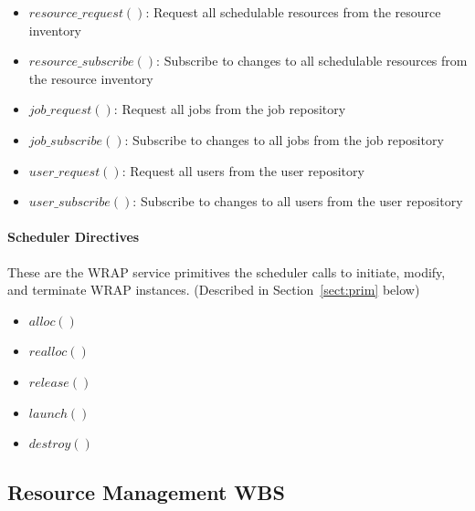 \begin{itemize}
\item{$resource\_request()$: Request all schedulable resources from
  the resource inventory}
\item{$resource\_subscribe()$: Subscribe to changes to all schedulable
  resources from the resource inventory}
\item{$job\_request()$: Request all jobs from the job repository}
\item{$job\_subscribe()$: Subscribe to changes to all jobs from the
  job repository}
\item{$user\_request()$: Request all users from the user repository}
\item{$user\_subscribe()$: Subscribe to changes to all users from the
  user repository}
\end{itemize}

\paragraph{Scheduler Directives}
These are the WRAP service primitives the scheduler calls to initiate,
modify, and terminate WRAP instances. (Described in
Section~\ref{sect:prim} below)

\begin{itemize}
\item{$alloc()$}
\item{$realloc()$}
\item{$release()$}
\item{$launch()$}
\item{$destroy()$}
\end{itemize}

\ifwbs
\subsection{Resource Management WBS}

